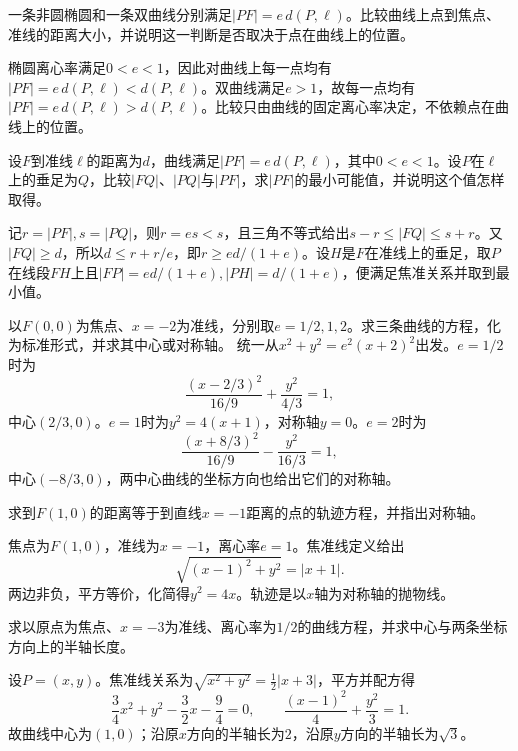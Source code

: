 一条非圆椭圆和一条双曲线分别满足\(|PF|=e\,d(P,\ell)\)。比较曲线上点到焦点、准线的距离大小，并说明这一判断是否取决于点在曲线上的位置。
\par
\solutionanswer
椭圆离心率满足\(0<e<1\)，因此对曲线上每一点均有\(|PF|=e\,d(P,\ell)<d(P,\ell)\)。双曲线满足\(e>1\)，故每一点均有\(|PF|=e\,d(P,\ell)>d(P,\ell)\)。比较只由曲线的固定离心率决定，不依赖点在曲线上的位置。


设\(F\)到准线\(\ell\)的距离为\(d\)，曲线满足\(|PF|=e\,d(P,\ell)\)，其中\(0<e<1\)。设\(P\)在\(\ell\)上的垂足为\(Q\)，比较\(|FQ|\)、\(|PQ|\)与\(|PF|\)，求\(|PF|\)的最小可能值，并说明这个值怎样取得。
\par
\solutionanswer
记\(r=|PF|,s=|PQ|\)，则\(r=es<s\)，且三角不等式给出\(s-r\le|FQ|\le s+r\)。又\(|FQ|\ge d\)，所以\(d\le r+r/e\)，即\(r\ge ed/(1+e)\)。设\(H\)是\(F\)在准线上的垂足，取\(P\)在线段\(FH\)上且\(|FP|=ed/(1+e),|PH|=d/(1+e)\)，便满足焦准关系并取到最小值。


以\(F(0,0)\)为焦点、\(x=-2\)为准线，分别取\(e=1/2,1,2\)。求三条曲线的方程，化为标准形式，并求其中心或对称轴。
\solutionanswer
统一从\(x^2+y^2=e^2(x+2)^2\)出发。\(e=1/2\)时为
\[
\frac{(x-2/3)^2}{16/9}+\frac{y^2}{4/3}=1,
\]
中心\((2/3,0)\)。\(e=1\)时为\(y^2=4(x+1)\)，对称轴\(y=0\)。\(e=2\)时为
\[
\frac{(x+8/3)^2}{16/9}-\frac{y^2}{16/3}=1,
\]
中心\((-8/3,0)\)，两中心曲线的坐标方向也给出它们的对称轴。


求到\(F(1,0)\)的距离等于到直线\(x=-1\)距离的点的轨迹方程，并指出对称轴。
\par
\solutionanswer
焦点为\(F(1,0)\)，准线为\(x=-1\)，离心率\(e=1\)。焦准线定义给出
\[
\sqrt{(x-1)^2+y^2}=|x+1|.
\]
两边非负，平方等价，化简得\(y^2=4x\)。轨迹是以\(x\)轴为对称轴的抛物线。


求以原点为焦点、\(x=-3\)为准线、离心率为\(1/2\)的曲线方程，并求中心与两条坐标方向上的半轴长度。
\par
\solutionanswer
设\(P=(x,y)\)。焦准线关系为\(\sqrt{x^2+y^2}=\frac12|x+3|\)，平方并配方得
\[
\frac34x^2+y^2-\frac32x-\frac94=0,
\qquad \frac{(x-1)^2}{4}+\frac{y^2}{3}=1.
\]
故曲线中心为\((1,0)\)；沿原\(x\)方向的半轴长为\(2\)，沿原\(y\)方向的半轴长为\(\sqrt3\)。


